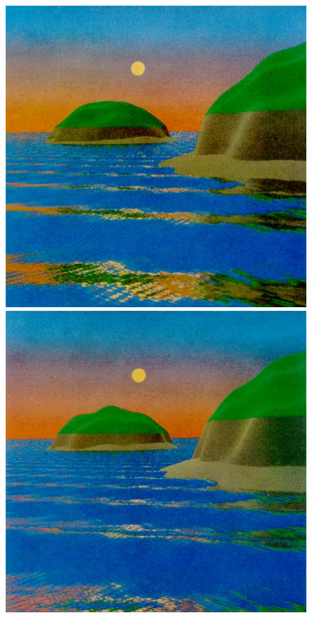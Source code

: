 \begin{figure}
{  \includegraphics[scale=0.25]{figures/Vectorized_Procedural_Models_for_Natural_Terrain_-_Max_1981-007_1.png}
 }
 \hfill
 \subtop
 {
  \includegraphics[scale=0.25]{figures/Vectorized_Procedural_Models_for_Natural_Terrain_-_Max_1981-006_2.png}
}
\end{figure}
